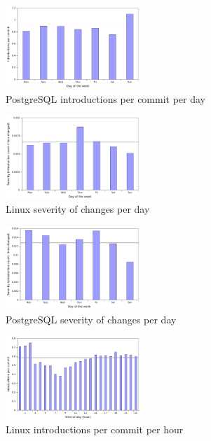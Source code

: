 \begin{figure}
\begin{center}
\includegraphics[width=0.45\textwidth]{postgresql-introductions-day.pdf}
\end{center}
\caption{PostgreSQL introductions per commit per day}
\label{fig-postgresql-introductions-day}
\end{figure}


\begin{figure}
\begin{center}
\includegraphics[width=0.45\textwidth]{linux-severity-day.pdf}
\end{center}
\caption{Linux severity of changes per day}
\label{fig-linux-severity-day}
\end{figure}

\begin{figure}
\begin{center}
\includegraphics[width=0.45\textwidth]{postgresql-severity-day.pdf}
\end{center}
\caption{PostgreSQL severity of changes per day}
\label{fig-postgresql-severity-day}
\end{figure}



\begin{figure}
\begin{center}
\includegraphics[width=0.45\textwidth]{linux-introductions-hour.pdf}
\end{center}
\caption{Linux introductions per commit per hour}
\label{fig-linux-introductions-hour}
\end{figure}

